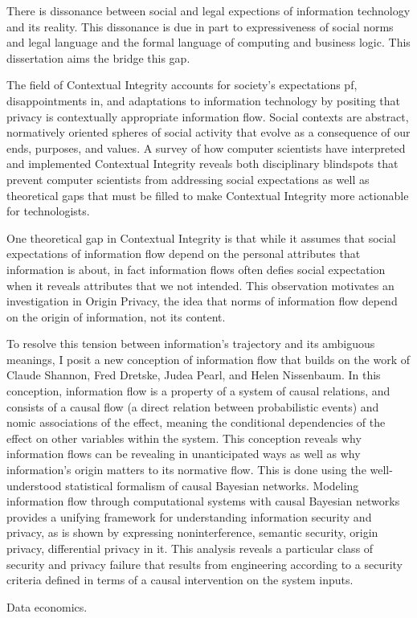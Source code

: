 \documentclass[../thesis.tex]{subfiles}
\begin{document}
 There is dissonance between social and legal expections of information technology and its reality.
 This dissonance is due in part to expressiveness of social norms and legal language and the formal language of computing and business logic.
 This dissertation aims the bridge this gap.

 The field of Contextual Integrity accounts for society's expectations pf,
 disappointments in, and adaptations to information technology by
 positing that privacy is contextually appropriate
 information flow.
 Social contexts are abstract, normatively oriented spheres of social activity
 that evolve as a consequence of our ends, purposes, and values.
 A survey of how computer scientists have interpreted and implemented
 Contextual Integrity reveals both disciplinary blindspots that prevent
 computer scientists from addressing social expectations as well as theoretical
 gaps that must be filled to make Contextual Integrity more actionable for
 technologists.

 One theoretical gap in Contextual Integrity is that while it assumes that social expectations of information flow depend on the personal attributes that information is about, in fact information flows often defies social expectation when it reveals attributes that we not intended.
 This observation motivates an investigation in Origin Privacy, the idea that norms of information flow depend on the origin of information, not its content.
 
 To resolve this tension between information's trajectory and its ambiguous meanings,
 I posit a new conception of information flow that builds on the work of Claude Shannon, Fred Dretske, Judea Pearl, and Helen Nissenbaum. In this conception, information flow
 is a property of a system of causal relations, and consists of a causal flow (a direct
 relation between probabilistic events) and nomic associations of the effect, meaning the conditional dependencies of the effect on other variables within the system.
 This conception reveals why information flows can be revealing in unanticipated ways as well as why information's origin matters to its normative flow. This is done using the well-understood statistical formalism of causal Bayesian networks.
 Modeling information flow through computational systems with causal Bayesian networks
 provides a unifying framework for understanding information security and privacy,
 as is shown by expressing noninterference, semantic security, origin privacy, differential privacy in it.
 This analysis reveals a particular class of security and privacy failure that results from engineering according to a security criteria defined in terms of a causal intervention on the system inputs.

 
 Data economics.
 
\end{document}
